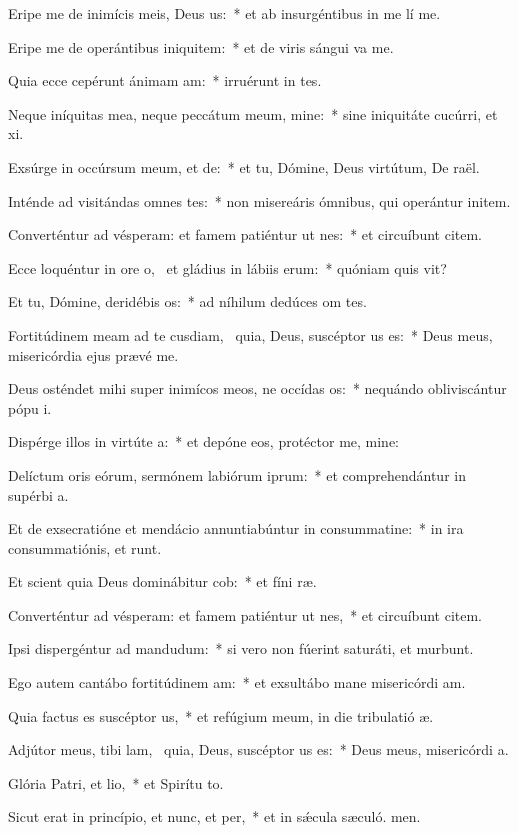 \item Eripe me de inimícis meis, Deus us:~* et ab insurgéntibus in me lí me.
\item Eripe me de operántibus iniquitem:~* et de viris sángui va me.
\item Quia ecce cepérunt ánimam am:~* irruérunt in  tes.
\item Neque iníquitas mea, neque peccátum meum, mine:~* sine iniquitáte cucúrri, et xi.
\item Exsúrge in occúrsum meum, et de:~* et tu, Dómine, Deus virtútum, De raël.
\item Inténde ad visitándas omnes tes:~* non misereáris ómnibus, qui operántur initem.
\item Converténtur ad vésperam: et famem patiéntur ut nes:~* et circuíbunt citem.
\item Ecce loquéntur in ore o,~\pscross{} et gládius in lábiis erum:~* quóniam quis vit?
\item Et tu, Dómine, deridébis os:~* ad níhilum dedúces om tes.
\item Fortitúdinem meam ad te cusdiam,~\pscross{} quia, Deus, suscéptor us es:~* Deus meus, misericórdia ejus prævé me.
\item Deus osténdet mihi super inimícos meos, ne occídas os:~* nequándo obliviscántur pópu i.
\item Dispérge illos in virtúte a:~* et depóne eos, protéctor me, mine:
\item Delíctum oris eórum, sermónem labiórum iprum:~* et comprehendántur in supérbi a.
\item Et de exsecratióne et mendácio annuntiabúntur in consummatine:~* in ira consummatiónis, et  runt.
\item Et scient quia Deus dominábitur cob:~* et fíni ræ.
\item Converténtur ad vésperam: et famem patiéntur ut nes,~* et circuíbunt citem.
\item Ipsi dispergéntur ad mandudum:~* si vero non fúerint saturáti, et murbunt.
\item Ego autem cantábo fortitúdinem am:~* et exsultábo mane misericórdi am.
\item Quia factus es suscéptor us,~* et refúgium meum, in die tribulatió æ.
\item Adjútor meus, tibi lam,~\pscross{} quia, Deus, suscéptor us es:~* Deus meus, misericórdi a.
\item Glória Patri, et lio,~* et Spirítu to.
\item Sicut erat in princípio, et nunc, et per,~* et in sǽcula sæculó. men.
